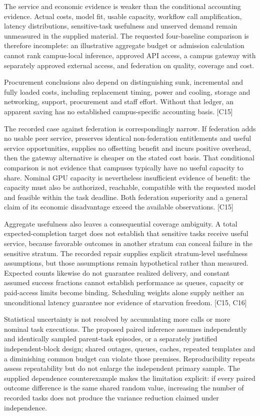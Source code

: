 \documentclass[11pt]{article}
\begin{document}
The service and economic evidence is weaker than the conditional accounting evidence. Actual costs, model fit, usable capacity, workflow call amplification, latency distributions, sensitive-task usefulness and unserved demand remain unmeasured in the supplied material. The requested four-baseline comparison is therefore incomplete: an illustrative aggregate budget or admission calculation cannot rank campus-local inference, approved API access, a campus gateway with separately approved external access, and federation on quality, coverage and cost.

Procurement conclusions also depend on distinguishing sunk, incremental and fully loaded costs, including replacement timing, power and cooling, storage and networking, support, procurement and staff effort. Without that ledger, an apparent saving has no established campus-specific accounting basis. [C15]

The recorded case against federation is correspondingly narrow. If federation adds no usable peer service, preserves identical non-federation entitlements and useful service opportunities, supplies no offsetting benefit and incurs positive overhead, then the gateway alternative is cheaper on the stated cost basis. That conditional comparison is not evidence that campuses typically have no useful capacity to share. Nominal GPU capacity is nevertheless insufficient evidence of benefit: the capacity must also be authorized, reachable, compatible with the requested model and feasible within the task deadline. Both federation superiority and a general claim of its economic disadvantage exceed the available observations. [C15]

Aggregate usefulness also leaves a consequential coverage ambiguity. A total expected-completion target does not establish that sensitive tasks receive useful service, because favorable outcomes in another stratum can conceal failure in the sensitive stratum. The recorded repair supplies explicit stratum-level usefulness assumptions, but those assumptions remain hypothetical rather than measured. Expected counts likewise do not guarantee realized delivery, and constant assumed success fractions cannot establish performance as queues, capacity or paid-access limits become binding. Scheduling weights alone supply neither an unconditional latency guarantee nor evidence of starvation freedom. [C15, C16]

Statistical uncertainty is not resolved by accumulating more calls or more nominal task executions. The proposed paired inference assumes independently and identically sampled parent-task episodes, or a separately justified independent-block design; shared outages, queues, caches, repeated templates and a diminishing common budget can violate those premises. Reproducibility repeats assess repeatability but do not enlarge the independent primary sample. The supplied dependence counterexample makes the limitation explicit: if every paired outcome difference is the same shared random value, increasing the number of recorded tasks does not produce the variance reduction claimed under independence.
\end{document}
